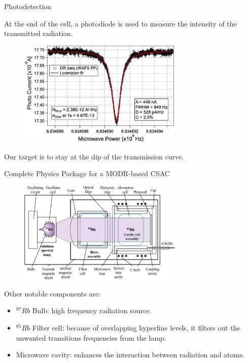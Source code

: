 \begin{frame}{Photodetection}

    At the end of the cell, a photodiode is used to measure the intensity of the transmitted radiation.

    \begin{figure}
        \centering
        \includegraphics[width=0.7\textwidth]{img/MODR-transmission-curve.jpg}
    \end{figure}

    Our target is to stay at the dip of the transmission curve.

\end{frame}



\begin{frame}{Complete Physics Package for a MODR-based CSAC}


    \begin{figure}
        \centering
        \includegraphics[width=0.7\textwidth]{img/MODR-physics-package.png}
    \end{figure}

    Other notable components are:

    \begin{itemize}
        \item $^{87}Rb$ Bulb: high frequency radiation source.
        \item $^{85}Rb$ Filter cell: because of overlapping hyperfine levels, it filters out the unwanted transitions frequencies from the lamp.
        \item Microwave cavity: enhances the interaction between radiation and atoms.
    \end{itemize}

\end{frame}


